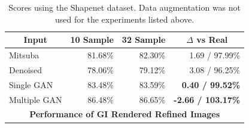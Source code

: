 \documentclass[10pt,twocolumn,letterpaper]{article}
\begin{document}
\begin{table}[]
\centering
\begin{tabular}{|l|r|r|r|}
\hline
\multicolumn{1}{|c|}{\textbf{Input}}
& \multicolumn{1}{c|}{\textbf{10 Sample}}
& \multicolumn{1}{c|}{\textbf{32 Sample}}
& \multicolumn{1}{c|}{\textbf{$\Delta$ vs Real}} \\ \hline
Mitsuba		& 81.68\%	& 82.30\%	& 1.69 / 97.99\% \\
Denoised	& 78.06\%	& 79.12\%	& 3.08 / 96.25\%	\\
Single GAN	& 83.48\%	& 83.59\%	& \textbf{0.40 / 99.52\%}	\\
Multiple GAN& 86.48\%	& 86.65\% 	& \textbf{-2.66 / 103.17\%}		\\ \hline
\multicolumn{4}{|c|}{\textbf{Performance of GI Rendered Refined Images}}	\\ \hline
\end{tabular}
\caption{Scores using the Shapenet dataset. Data augmentation was not used for the experiments listed above.}
\label{tblallrefined}
\end{table}
\end{document}
